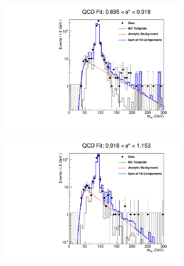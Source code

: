 \begin{figure}[!htbp]
    \centering
    \begin{subfigure}[b]{\SideBySidePlotWidth}
        \includegraphics[width=\linewidth]{figures/qcd_fits/qcd_fit_plot_for_29.pdf}
        \caption{}
        \label{fig:qcd_fit_29}
    \end{subfigure}%
    \begin{subfigure}[b]{\SideBySidePlotWidth}
        \includegraphics[width=\linewidth]{figures/qcd_fits/qcd_fit_plot_for_30.pdf}
        \caption{}
        \label{fig:qcd_fit_30}
    \end{subfigure}
    \begin{subfigure}[b]{\SideBySidePlotWidth}

\end{subfigure}
\end{figure}
